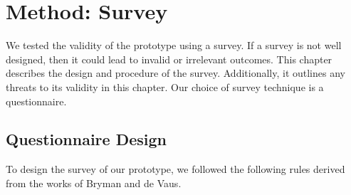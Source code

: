 \section{Method: Survey}
\label{section:Method_survey}

We tested the validity of the prototype using a survey.
If a survey is not well designed, then it could lead to invalid or irrelevant outcomes.
This chapter describes the design and procedure of the survey.
Additionally, it outlines any threats to its validity in this chapter.
Our choice of survey technique is a questionnaire.

\subsection{Questionnaire Design}
To design the survey of our prototype, we followed the following rules derived from the works of Bryman\cite{bryman2016social} and de Vaus\cite{de2013surveys}.

